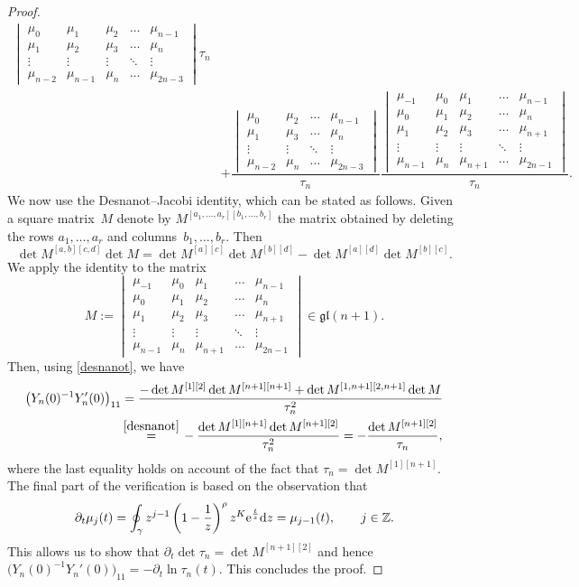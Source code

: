 \documentclass[10pt,a4paper]{amsart}
\numberwithin{equation}{section}
\theoremstyle{definition}
\def\le{\left}
\def\ri{\right}
\def \d{{\mathrm d}}
\def\nn{\nonumber}
\def\be{\begin{equation}}
\def\ee{\end{equation}}
\def\Z{{\mathbb Z}}
\def\pa{\partial}
\begin{document}
\begin{proof}
\begin{align*}
{\begin{vmatrix}
 \mu_0 & \mu_1 & \mu_2& \dots & \mu_{n-1} \\
 \mu_1 & \mu_2 & \mu_3 & \dots & \mu_{n}\\
 \vdots & \vdots & \vdots & \ddots & \vdots \\
 \mu_{n-2} & \mu_{n-1} & \mu_{n} & \dots & \mu_{2n-3}
\end{vmatrix}}{\tau_n}
\\
&+
\dfrac{\begin{vmatrix}
 \mu_0 & \mu_2 & \dots & \mu_{n-1} \\
 \mu_1 & \mu_3 & \dots & \mu_{n} \\
 \vdots & \vdots & \ddots & \vdots \\
 \mu_{n-2} & \mu_{n} & \dots & \mu_{2n-3}
\end{vmatrix}}{\tau_n}
\dfrac{\begin{vmatrix}
 \mu_{-1} & \mu_0 & \mu_1 & \dots & \mu_{n-1}\\
 \mu_0 & \mu_1 & \mu_2& \dots & \mu_{n} \\
 \mu_1 & \mu_2 & \mu_3 & \dots & \mu_{n+1} \\
 \vdots & \vdots & \vdots & \ddots & \vdots \\
 \mu_{n-1} & \mu_{n} & \mu_{n+1} & \dots & \mu_{2n-1}
 \end{vmatrix}}{\tau_n}.
\end{align*}
We now use the Desnanot--Jacobi identity, which can be stated as follows. Given a square matrix~$M$ denote by $M^{[a_1,\dots, a_r][b_1,\dots, b_r]}$ the matrix obtained by deleting the rows $a_1,\dots, a_r$ and columns~${b_1,\dots, b_r}$. Then
\be
\label{desnanot}
\det M^{[a,b][c,d]} \det M = \det M^{[a][c]} \det M^{[b][d]} - \det M^{[a][d]} \det M^{[b][c]}.
\ee
We apply the identity to the matrix
\[
M := \begin{vmatrix}
 \mu_{-1} & \mu_0 & \mu_1 & \dots & \mu_{n-1}\\
 \mu_0 & \mu_1 & \mu_2 & \dots & \mu_{n} \\
 \mu_1 & \mu_2 & \mu_3 & \dots & \mu_{n+1} \\
 \vdots & \vdots & \vdots & \ddots & \vdots \\
 \mu_{n-1}& \mu_{n}& \mu_{n+1} & \dots & \mu_{2n-1}
\end{vmatrix}\in \mathfrak{gl}(n+1).
\]
Then, using \eqref{desnanot}, we have
\begin{align*}
\bigl(Y_n(0)^{-1} Y_n'(0)\bigr)_{11}&= \frac {-\det M^{[1][2]} \det M^{[n+1][n+1]} + \det M^{[1,n+1][2,n+1]} \det M}{\tau_n^2}
\nn\\
&\mathop{=}^{\eqref{desnanot}}{}
-\frac {\det M^{[1][n+1]} \det M^{[n+1][2]}}{\tau_n^2} =- \frac { \det M^{[n+1][2]}}{\tau_n},
\end{align*}
where the last equality holds on account of the fact that $\tau_n = \det M^{[1][n+1]}$.
The final part of the verification is based on the observation that
\[
\pa_t \mu_j(t) = \oint_{\gamma} z^{j-1} \le(1-\frac 1 z\ri)^{ {\rho}} z^{{K}} {\rm e}^{\frac t z}\d z= \mu_{j-1}(t), \qquad j\in \Z.
\]
This allows us to show that
$
\pa_t \det \tau_n =\det M^{[n+1][2]}
$
and hence
$
\bigl(Y_n(0)^{-1} Y_n'(0)\bigr)_{11}= -\pa_t\ln \tau_n(t)$.
This concludes the proof.
\end{proof}
\end{document}
